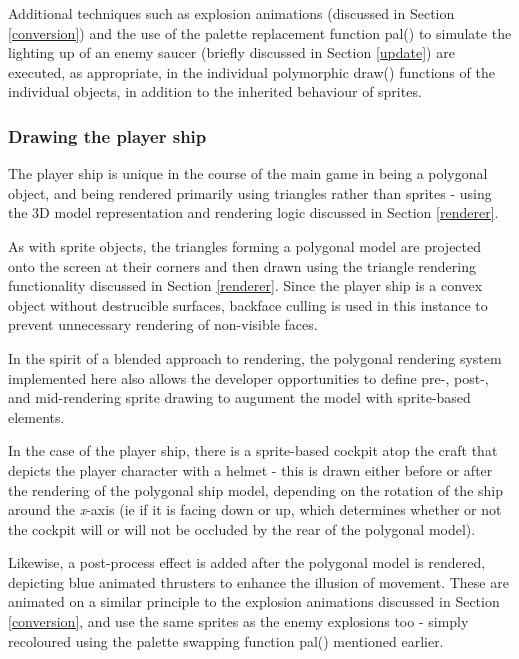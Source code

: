 \documentclass[11pt]{article}
\begin{document}
Additional techniques such as explosion animations (discussed in Section \ref{conversion}) and the
use of the palette replacement function pal() to simulate the lighting up of an enemy saucer (briefly
discussed in Section \ref{update}) are executed, as appropriate, in the individual polymorphic draw() 
functions of the individual objects, in addition to the inherited behaviour of sprites.


\subsubsection*{Drawing the player ship}

The player ship is unique in the course of the main game in being a polygonal object, and being
rendered primarily using triangles rather than sprites - using the 3D model representation and
rendering logic discussed in Section \ref{renderer}.

As with sprite objects, the triangles forming a polygonal model are projected onto the screen at their
corners and then drawn using the triangle rendering functionality discussed in Section \ref{renderer}. Since
the player ship is a convex object without destrucible surfaces, backface culling is used in this
instance to prevent unnecessary rendering of non-visible faces.

In the spirit of a blended approach to rendering, the polygonal rendering system implemented here 
also allows the developer opportunities to define pre-, post-, and mid-rendering sprite drawing to
augument the model with sprite-based elements.

In the case of the player ship, there is a sprite-based
cockpit atop the craft that depicts the player character with a helmet - this is drawn either before
or after the rendering of the polygonal ship model, depending on the rotation of the ship around the
\textit{x}-axis (ie if it is facing down or up, which determines whether or not the cockpit will or
will not be occluded by the rear of the polygonal model).

Likewise, a post-process effect is added after the polygonal model is rendered, depicting blue
animated thrusters to enhance the illusion of movement. These are animated on a similar principle
to the explosion animations discussed in Section \ref{conversion}, and use the same sprites as
the enemy explosions too - simply recoloured using the palette swapping function pal() mentioned
earlier.
\end{document}

